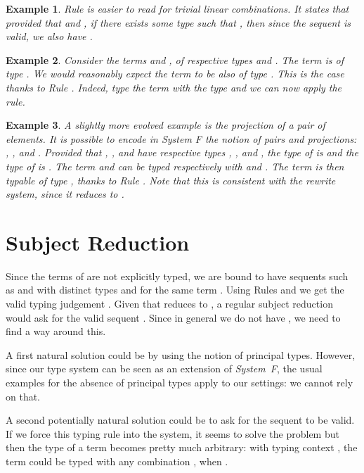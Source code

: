 \documentclass[colorlinks=true,linkcolor=black,urlcolor=black,citecolor=blue,submission,copyright,creativecommons]{eptcs}
\newtheorem{example}{Example}[section]
\begin{document}
\begin{example}\rm
  Rule  is easier to read for trivial linear
  combinations. It states that provided that  and , if there exists
  some type  such that , then since the sequent
   is valid, we also have
  .
\end{example}

\begin{example}\rm
  Consider the terms  and , of respective types
   and . The term  is of type
  . We would reasonably expect the term  to be also of type . This is the case
  thanks to Rule . Indeed, type the term  with the
  type  and we can now apply the rule.
\end{example}

\begin{example}\label{ex:3}\rm
  A slightly more evolved example is the projection of a pair of
  elements. It is possible to encode in {\em System F} the notion of pairs
  and projections: , ,  and
  . Provided that , ,  and  have respective types , ,
   and , the type of  is  and the type of  is . The term 
  and  can be typed respectively with  and .
    The term  is then typable of type , thanks
  to Rule . Note that this is consistent with the rewrite
  system, since it reduces to .
\end{example}


\section{Subject Reduction}\label{sec:sr}

Since the terms of  are not explicitly typed, we are bound to
have sequents such as  and
 with distinct types  and 
for the same term .
Using Rules
 and  we get the valid typing judgement
. Given that 
reduces to , a regular subject reduction
would ask for the valid sequent .  Since in general we do not
have , we need to find a way around
this.

A first natural solution could be by using the notion of principal
types. However, since our type system can be seen as an extension of {\em System~F},
the usual examples for the absence of principal types apply to our
settings: we cannot rely on that.

A second potentially natural solution could be to ask for the sequent
 to be valid. If we force this typing rule into the system, it
seems to solve the problem but then the type of a term becomes pretty
much arbitrary: with typing context , the term
 could be typed with any combination
, when .
\end{document}
